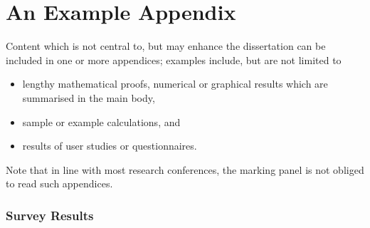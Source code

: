 \documentclass[ %
                    author={Jonathan Rankin},
                supervisor={Dr. David May, Dr. Ian Holyer},
                    degree={MEng},
                     title={CodeTouch},
                  subtitle={A Revolutionary Way To Program Real Code On Touch Screen Devices},
                      type={enterprise},
                      year={2015 } ]{dissertation}
\begin{document}
\appendix

\chapter{An Example Appendix}
\label{appx:example}



Content which is not central to, but may enhance the dissertation can
be included in one or more appendices; examples include, but are not 
limited to

\begin{itemize}
\item lengthy mathematical proofs, numerical or graphical results
      which are summarised in the main body,
\item sample or example calculations, 
      and
\item results of user studies or questionnaires.
\end{itemize}


\noindent
Note that in line with most research conferences, the marking panel 
is not obliged to read such appendices.

\subsection{Survey Results}
\label{ssec:survey}

\end{document}

